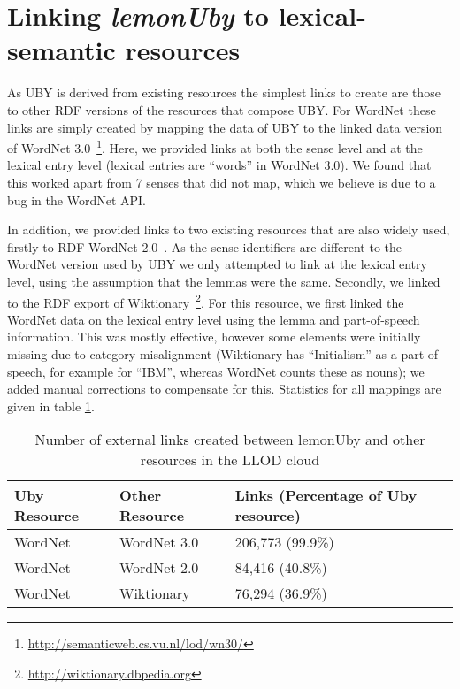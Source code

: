 \section{Linking \emph{lemonUby} to lexical-semantic resources}

As UBY is derived from existing resources the simplest links to create are those
to other RDF versions of the resources that compose UBY. For WordNet these links 
are simply created by mapping the data of UBY to the linked data version of 
WordNet 3.0~\footnote{\url{http://semanticweb.cs.vu.nl/lod/wn30/}}. Here,
we provided links at both the sense level and at the lexical entry level 
(lexical entries are ``words'' in WordNet 3.0). We found that this worked apart
from 7 senses that did not map, which we believe is due to a bug in the 
WordNet API. 

In addition, we provided links to two existing resources that are also widely
used, firstly to RDF WordNet 2.0~\cite{van2006conversion}. As the sense identifiers are
different to the WordNet version used by UBY we only attempted to link at the lexical 
entry level, using the assumption that the lemmas were the same. Secondly, we 
linked to the RDF export of Wiktionary~\footnote{\url{http://wiktionary.dbpedia.org}}.
For this resource, we first linked the WordNet data on the lexical entry level using 
the lemma and part-of-speech information. This was mostly effective, however some
elements were initially missing due to category misalignment (Wiktionary has
``Initialism'' as a part-of-speech, for example for ``IBM'', whereas WordNet
counts these as nouns); we added manual corrections to compensate 
for this. Statistics for all mappings are given in table \ref{mapping-stats}.

\begin{table}
  \begin{tabular}{|l|l|p{3cm}|}
    \hline
    Uby Resource & Other Resource & Links (Percentage of Uby resource) \\
    \hline
    WordNet & WordNet 3.0 & 206,773 (99.9\%)\\
    WordNet & WordNet 2.0 & 84,416 (40.8\%) \\
    WordNet & Wiktionary & 76,294 (36.9\%) \\
    \hline
  \end{tabular}
  \caption{Number of external links created between lemonUby and other resources
  in the LLOD cloud \label{mapping-stats}}
\end{table}
  	  
  





